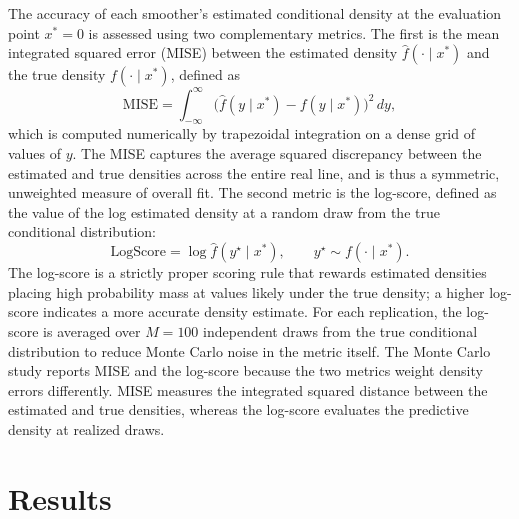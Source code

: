 \documentclass[12pt]{report} %
\begin{document}
The accuracy of each smoother's estimated conditional density at the evaluation point $x^* = 0$ is assessed using two complementary metrics. The first is the mean integrated squared error (MISE) between the estimated density $\hat{f}(\cdot \mid x^*)$ and the true density $f(\cdot \mid x^*)$, defined as
\[
\text{MISE} = \int_{-\infty}^{\infty} \bigl(\hat{f}(y \mid x^*) - f(y \mid x^*)\bigr)^2 \, dy,
\]
which is computed numerically by trapezoidal integration on a dense grid of values of $y$. The MISE captures the average squared discrepancy between the estimated and true densities across the entire real line, and is thus a symmetric, unweighted measure of overall fit. The second metric is the log-score, defined as the value of the log estimated density at a random draw from the true conditional distribution:
\[
\text{LogScore} = \log \hat{f}(y^\star \mid x^*), \qquad y^\star \sim f(\cdot \mid x^*).
\]
The log-score is a strictly proper scoring rule \parencite{gneiting2007strictly} that rewards estimated densities placing high probability mass at values likely under the true density; a higher log-score indicates a more accurate density estimate. For each replication, the log-score is averaged over $M = 100$ independent draws from the true conditional distribution to reduce Monte Carlo noise in the metric itself. The Monte Carlo study reports MISE and the log-score because the two metrics weight density errors differently. MISE measures the integrated squared distance between the estimated and true densities, whereas the log-score evaluates the predictive density at realized draws.

\section{Results}
\label{sec:mc-results}
\end{document}
